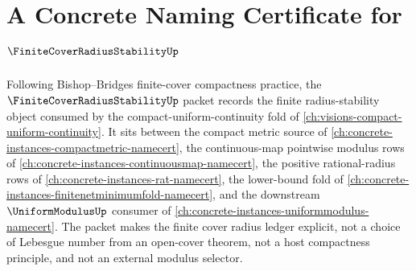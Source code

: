 \chapter{A Concrete Naming Certificate for $\FiniteCoverRadiusStabilityUp$}
\label{ch:concrete-instances-finite-cover-radius-stability-namecert}

Following Bishop--Bridges finite-cover compactness practice, the $\FiniteCoverRadiusStabilityUp$ packet records the finite radius-stability object consumed by the compact-uniform-continuity fold of \autoref{ch:visions-compact-uniform-continuity}. It sits between the compact metric source of \autoref{ch:concrete-instances-compactmetric-namecert}, the continuous-map pointwise modulus rows of \autoref{ch:concrete-instances-continuousmap-namecert}, the positive rational-radius rows of \autoref{ch:concrete-instances-rat-namecert}, the lower-bound fold of \autoref{ch:concrete-instances-finitenetminimumfold-namecert}, and the downstream $\UniformModulusUp$ consumer of \autoref{ch:concrete-instances-uniformmodulus-namecert}. The packet makes the finite cover radius ledger explicit, not a choice of Lebesgue number from an open-cover theorem, not a host compactness principle, and not an external modulus selector.

